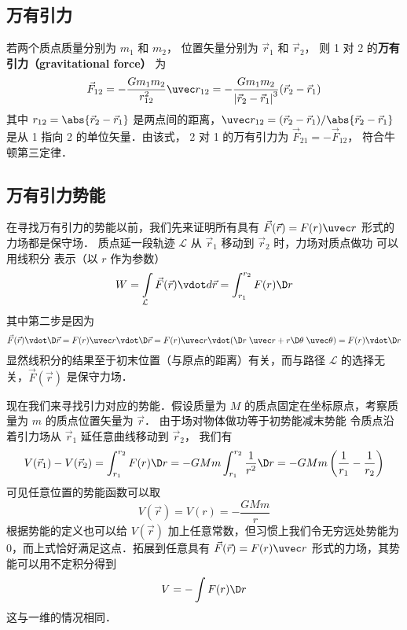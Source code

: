 
\subsection{万有引力}

若两个质点质量分别为 $m_1$ 和 $m_2$， 位置矢量分别为 $\vec r_1$ 和 $\vec r_2$， 则 1 对 2 的\textbf{万有引力（gravitational force）} 为
\begin{equation}
{\vec F_{12}} =  - \frac{{G{m_1}{m_2}}}{{{r_{12}^2}}}{\uvec r_{12}} = - \frac{{G{m_1}{m_2}}}{{{{\left| {{{\vec r}_2} - {{\vec r}_1}} \right|}^3}}}({\vec r_2} - {\vec r_1})
\end{equation}
其中 $r_{12} = \abs{\vec r_2 - \vec r_1}$ 是两点间的距离，$\uvec r_{12} = (\vec r_2 - \vec r_1)/\abs{\vec r_2 - \vec r_1}$ 是从 1 指向 2 的单位矢量．由该式， 2 对 1 的万有引力为 $\vec F_{21} = -\vec F_{12}$， 符合牛顿第三定律．

\subsection{万有引力势能}

在寻找万有引力的势能以前，我们先来证明所有具有 $\vec F(\vec r) = F(r) \uvec r$ 形式的力场都是保守场． 质点延一段轨迹 $\mathcal{L}$ 从 $\vec r_1$ 移动到 $\vec r_2$ 时，力场对质点做功 可以用线积分 表示（以 $r$ 作为参数）
\begin{equation}
W = \int\limits_\mathcal{L} {\vec F(\vec r) \vdot d\vec r} = \int_{{r_1}}^{{r_2}} {F(r) \D r} 
\end{equation}
其中第二步是因为
\begin{equation}
\vec F(\vec r) \vdot \D\vec r = F(r)\uvec r \vdot \D\vec r = F(r)\uvec  r \vdot (\D r\;\uvec  r + r\D\theta \;\uvec  \theta ) = F(r) \vdot \D r
\end{equation}
显然线积分的结果至于初末位置（与原点的距离）有关，而与路径 $\mathcal{L}$ 的选择无关，$\vec F(\vec r)$ 是保守力场．

现在我们来寻找引力对应的势能．假设质量为 $M$ 的质点固定在坐标原点，考察质量为 $m$ 的质点位置矢量为 $\vec r$． 由于场对物体做功等于初势能减末势能
令质点沿着引力场从 ${\vec r_1}$ 延任意曲线移动到 ${\vec r_2}$， 我们有
\begin{equation}
V({\vec r_1}) - V({\vec r_2}) = \int_{{r_1}}^{{r_2}} {F(r)\D r}  =  - GMm\int_{{r_1}}^{{r_2}} {\frac{1}{{{r^2}}}\D r}  =  - GMm\left( {\frac{1}{{{r_1}}} - \frac{1}{{{r_2}}}} \right)
\end{equation}
可见任意位置的势能函数可以取
\begin{equation}
V(\vec r) = V(r) = - \frac{{GMm}}{r}
\end{equation}
根据势能的定义也可以给 $V(\vec r)$ 加上任意常数，但习惯上我们令无穷远处势能为 0，而上式恰好满足这点．拓展到任意具有 $\vec F(\vec r) = F(r)\uvec r$ 形式的力场，其势能可以用不定积分得到
\begin{equation}
V = -\int F(r) \D r
\end{equation}
这与一维的情况相同．%

